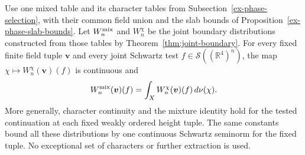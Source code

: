 \begin{proposition}\label{prop:assembly-boundary-barycenter}
Use one mixed table and its character tables from
Subsection~\ref{ex-phase-selection}, with their common field union and the
slab bounds of Proposition~\ref{ex-phase-slab-bounds}. Let
$W_n^{\rm mix}$ and $W_n^\chi$ be the joint boundary distributions
constructed from those tables by Theorem~\ref{thm:joint-boundary}.
For every fixed finite field tuple $\boldsymbol v$ and every joint
Schwartz test $f\in\mathscr S((\mathbb R^4)^n)$, the map
$\chi\mapsto W_n^\chi(\boldsymbol v)(f)$ is continuous and
\begin{equation}\label{eq:assembly-boundary-barycenter}
 W_n^{\rm mix}(\boldsymbol v)(f)
       =\int_X W_n^\chi(\boldsymbol v)(f)\,d\nu(\chi).
\end{equation}
More generally, character continuity and the mixture identity hold for
the tested continuation at each fixed weakly ordered height tuple.
The same constants bound all these distributions by one continuous
Schwartz seminorm for the fixed tuple. No exceptional set of characters
or further extraction is used.
\end{proposition}
